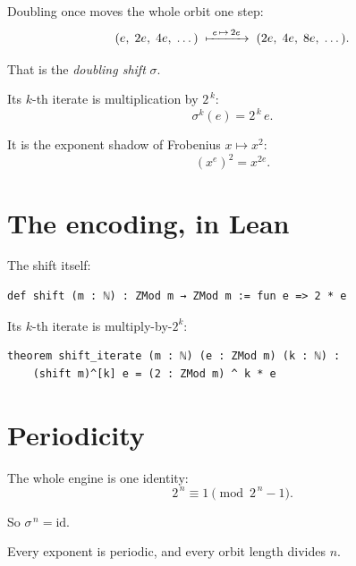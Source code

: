 \documentclass[11pt]{article}
\begin{document}
Doubling once moves the whole orbit one step:
\[
  (e,\; 2e,\; 4e,\; \dots)
  \;\xmapsto{\ e\,\mapsto\, 2e\ }\;
  (2e,\; 4e,\; 8e,\; \dots).
\]

\bigskip

That is the \emph{doubling shift} $\sigma$.

\bigskip

Its $k$-th iterate is multiplication by $2^{\,k}$:
\[
  \sigma^{k}(e) = 2^{\,k}\, e .
\]

\bigskip

It is the exponent shadow of Frobenius $x \mapsto x^{2}$:
\[
  (x^{e})^{2} = x^{2e}.
\]

\bigskip


\newpage


\section{The encoding, in Lean}

\bigskip

The shift itself:

\begin{lstlisting}
def shift (m : ℕ) : ZMod m → ZMod m := fun e => 2 * e
\end{lstlisting}

\bigskip

Its $k$-th iterate is multiply-by-$2^{k}$:

\begin{lstlisting}
theorem shift_iterate (m : ℕ) (e : ZMod m) (k : ℕ) :
    (shift m)^[k] e = (2 : ZMod m) ^ k * e
\end{lstlisting}

\bigskip


\newpage


\section{Periodicity}

\bigskip

The whole engine is one identity:
\[
  2^{\,n} \equiv 1 \pmod{2^{\,n}-1}.
\]

\bigskip

So $\sigma^{\,n} = \mathrm{id}$.

\bigskip

Every exponent is periodic, and every orbit length divides $n$.
\end{document}
